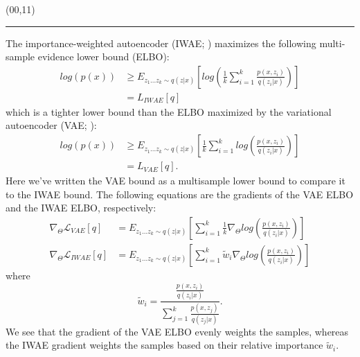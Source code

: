 \documentclass{article}
\newcommand{\eqname}[1]{\tag*{#1}}
\def\CHead#1{\begin{center}\noindent{\LARGE\color{DarkBlue} #1}\end{center}}
\renewcommand{\LARGE}{\fontsize{43}{54}\selectfont}
\begin{document}
\begin{textblock}{10}(00,11)
\CHead{Background} 
\hrule
\vspace{3mm}
The importance-weighted autoencoder (IWAE; \cite{burda2015importance}) maximizes the following multi-sample evidence lower bound (ELBO): 
\begin{align} 
    log(p(x)) & \geq E_{z_{1}...z_{k} \sim q(z|x)} \left[log\left(  \frac{1}{k}  \sum_{i=1}^k \frac{p(x,z_i)}{q(z_i|x)}  \right)  \right]  \nonumber \\
    &= L_{IWAE}[q] \nonumber %
\end{align}
which is a tighter lower bound than the ELBO maximized by the variational autoencoder (VAE; \cite{vae}):
\begin{align}
    log(p(x)) & \geq E_{z_{1}...z_{k} \sim q(z|x)} \left[  \frac{1}{k}\sum_{i=1}^k log\left(\frac{p(x,z_i)}{q(z_i|x)}  \right)  \right]  \nonumber \\
    &= L_{VAE}[q]. \nonumber %
\end{align}
Here we've written the VAE bound as a multisample lower bound to compare it to the IWAE bound. The following equations are the gradients of the VAE ELBO and the IWAE ELBO, respectively:
\begin{align} 
    \nabla_{\Theta} \mathcal{L}_{VAE}[q] &= E_{z_{1}...z_{k} \sim q(z|x)} \left[   \sum_{i=1}^k \frac{1}{k} \nabla_{\Theta} log\left(\frac{p(x,z_i)}{q(z_i|x)}  \right)  \right] \nonumber  \\ %
    \nabla_{\Theta} \mathcal{L}_{IWAE}[q] &= E_{z_{1}...z_{k} \sim q(z|x)} \left[  \sum_{i=1}^k \tilde{w}_i \nabla_{\Theta} log\left(\frac{p(x,z_i)}{q(z_i|x)}  \right)  \right] \nonumber %
\end{align}
where $$\tilde{w}_i = \frac{\frac{p(x,z_i)}{q(z_i|x)}}{\sum_{j=1}^k \frac{p(x,z_j)}{q(z_j|x)}}.$$
We see that the gradient of the VAE ELBO evenly weights the samples, whereas the IWAE gradient weights the samples based on their relative importance $\tilde{w}_i$.
\end{textblock}
\end{document}
